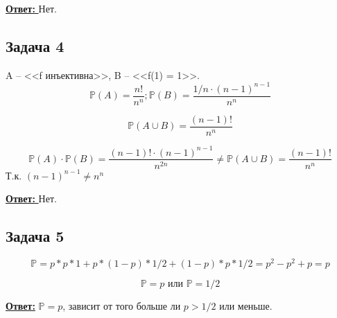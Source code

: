 \documentclass[a4paper,14pt]{article} %
\begin{document}
\underline{\textbf{Ответ: }} Нет.

\subsection{Задача 4}
A -- <<f инъективна>>, B -- <<f(1) = 1>>.
\begin{equation*}
	\mathds{P}(A) = \frac{n!}{n^n}; \mathds{P}(B) = \frac{1/n \cdot (n-1)^{n-1}}{n^n}	
\end{equation*}

\begin{equation*}
	\mathds{P}(A \cup B) = \frac{(n-1)!}{n^n}
\end{equation*}

\begin{equation*}
	\mathds{P}(A) \cdot \mathds{P}(B) = \frac{(n-1)! \cdot (n-1)^{n-1}}{n^{2n}} \not = \mathds{P}(A \cup B) = \frac{(n-1)!}{n^n}
\end{equation*}
Т.к. $(n-1)^{n-1} \not = n^n$

\underline{\textbf{Ответ: }} Нет.

\subsection{Задача 5}
\begin{equation*}
	\mathds{P} = p * p * 1 + p * (1-p) * 1/2 + (1-p) * p * 1/2 = p^2 - p^2 + p = p
\end{equation*}

\begin{equation*}
	\mathds{P} = p \text{  или  } \mathds{P} = 1/2
\end{equation*}

\underline{\textbf{Ответ:}} $\mathds{P} = p$, зависит от того больше ли $p > 1/2$ или меньше.
\end{document}
